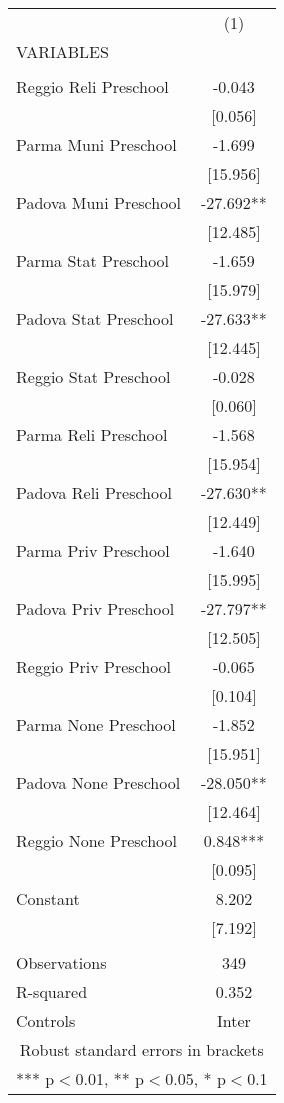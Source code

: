 \begin{tabular}{lc} \hline
 & (1) \\
VARIABLES &  \\ \hline
 &  \\
Reggio Reli Preschool & -0.043 \\
 & [0.056] \\
Parma Muni Preschool & -1.699 \\
 & [15.956] \\
Padova Muni Preschool & -27.692** \\
 & [12.485] \\
Parma Stat Preschool & -1.659 \\
 & [15.979] \\
Padova Stat Preschool & -27.633** \\
 & [12.445] \\
Reggio Stat Preschool & -0.028 \\
 & [0.060] \\
Parma Reli Preschool & -1.568 \\
 & [15.954] \\
Padova Reli Preschool & -27.630** \\
 & [12.449] \\
Parma Priv Preschool & -1.640 \\
 & [15.995] \\
Padova Priv Preschool & -27.797** \\
 & [12.505] \\
Reggio Priv Preschool & -0.065 \\
 & [0.104] \\
Parma None Preschool & -1.852 \\
 & [15.951] \\
Padova None Preschool & -28.050** \\
 & [12.464] \\
Reggio None Preschool & 0.848*** \\
 & [0.095] \\
Constant & 8.202 \\
 & [7.192] \\
 &  \\
Observations & 349 \\
R-squared & 0.352 \\
 Controls & Inter \\ \hline
\multicolumn{2}{c}{ Robust standard errors in brackets} \\
\multicolumn{2}{c}{ *** p$<$0.01, ** p$<$0.05, * p$<$0.1} \\
\end{tabular}
